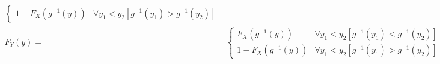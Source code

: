 \documentclass[
]{book}
\theoremstyle{definition}
\theoremstyle{definition}
\theoremstyle{definition}
\theoremstyle{definition}
\theoremstyle{remark}
\begin{document}
\[\begin{aligned}
\begin{cases}
1-F_{{\scriptscriptstyle X}}\left(g^{-1}\left(y\right)\right) & \forall y_{{\scriptscriptstyle 1}}<y_{{\scriptscriptstyle 2}}\left[g^{-1}\left(y_{{\scriptscriptstyle 1}}\right)>g^{-1}\left(y_{{\scriptscriptstyle 2}}\right)\right]
\end{cases}\\
F_{{\scriptscriptstyle Y}}\left(y\right)= & \begin{cases}
F_{{\scriptscriptstyle X}}\left(g^{-1}\left(y\right)\right) & \forall y_{{\scriptscriptstyle 1}}<y_{{\scriptscriptstyle 2}}\left[g^{-1}\left(y_{{\scriptscriptstyle 1}}\right)<g^{-1}\left(y_{{\scriptscriptstyle 2}}\right)\right]\\
1-F_{{\scriptscriptstyle X}}\left(g^{-1}\left(y\right)\right) & \forall y_{{\scriptscriptstyle 1}}<y_{{\scriptscriptstyle 2}}\left[g^{-1}\left(y_{{\scriptscriptstyle 1}}\right)>g^{-1}\left(y_{{\scriptscriptstyle 2}}\right)\right]
\end{cases}
\end{aligned}
\]
\end{document}
